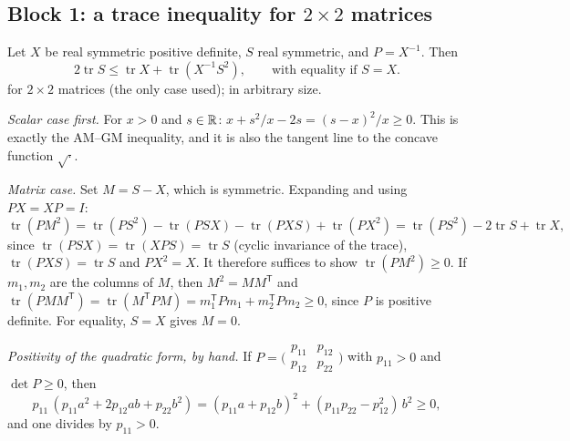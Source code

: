 \subsection{Block 1: a trace inequality for \texorpdfstring{$2\times2$}{2x2} matrices}\label{ch3:sec:trace}
\begin{lemma}\label{ch3:lem:trace}
Let $X$ be real symmetric positive definite, $S$ real symmetric, and $P=X^{-1}$. Then
\[
2\operatorname{tr}S\le\operatorname{tr}X+\operatorname{tr}(X^{-1}S^2),\qquad\text{with equality if }S=X.
\]
\tierAs{} for $2\times2$ matrices (the only case used); \tierC{} in arbitrary size.
\end{lemma}
\begin{humanproof}
\emph{Scalar case first.} For $x>0$ and $s\in\mathbb{R}$: $x+s^2/x-2s=(s-x)^2/x\ge0$. This is exactly the AM--GM
inequality, and it is also the tangent line to the concave function $\sqrt{\cdot}$.

\emph{Matrix case.} Set $M=S-X$, which is symmetric. Expanding and using $PX=XP=I$:
\[
\operatorname{tr}(PM^2)=\operatorname{tr}(PS^2)-\operatorname{tr}(PSX)-\operatorname{tr}(PXS)+\operatorname{tr}(PX^2)
=\operatorname{tr}(PS^2)-2\operatorname{tr}S+\operatorname{tr}X ,
\]
since $\operatorname{tr}(PSX)=\operatorname{tr}(XPS)=\operatorname{tr}S$ (cyclic invariance of the trace),
$\operatorname{tr}(PXS)=\operatorname{tr}S$ and $PX^2=X$. It therefore suffices to show
$\operatorname{tr}(PM^2)\ge0$. If $m_1,m_2$ are the columns of $M$, then $M^2=MM^{\mathsf T}$ and
$\operatorname{tr}(PMM^{\mathsf T})=\operatorname{tr}(M^{\mathsf T}PM)=m_1^{\mathsf T}Pm_1+m_2^{\mathsf T}Pm_2\ge0$, since
$P$ is positive definite. For equality, $S=X$ gives $M=0$.

\emph{Positivity of the quadratic form, by hand.} If
$P=\bigl(\begin{smallmatrix}p_{11}&p_{12}\\p_{12}&p_{22}\end{smallmatrix}\bigr)$ with $p_{11}>0$ and $\det P\ge0$, then
\[
p_{11}\,(p_{11}a^2+2p_{12}ab+p_{22}b^2)=(p_{11}a+p_{12}b)^2+(p_{11}p_{22}-p_{12}^2)\,b^2\ge0,
\]
and one divides by $p_{11}>0$.
\end{humanproof}

